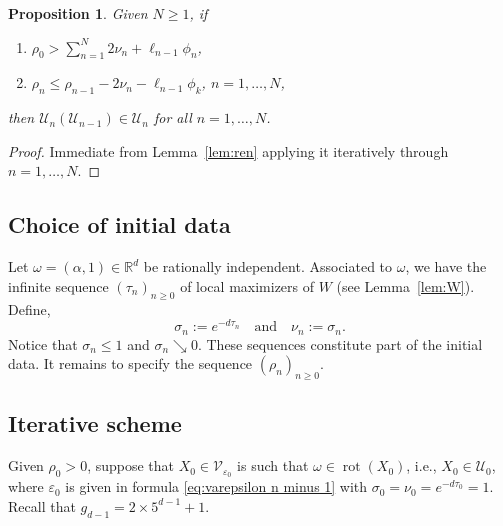 \documentclass[12pt,reqno,a4paper]{amsart}%
\numberwithin{equation}{section}
\newtheorem{proposition}[theorem]{Proposition}
\newcommand{\Vs}{{\mathscr{V}}}
\newcommand{\Us}{{\mathscr{U}}}
\newcommand{\UU}{{\mathcal U}}
\newcommand{\Rr}{{\mathbb{R}}}
\newcommand{\rot}{\operatorname{rot}}
\def\vecalf{{\text{$\alpha$}}}
\def\vecomega{{\text{$\omega$}}}
\begin{document}
\begin{proposition}\label{prop:ren}
Given $N\geq1$,  if
\begin{enumerate}
\item $\rho_{0}> \sum_{n=1}^{N}2\nu_{n}+\ell_{n-1}\phi_n$,  
\item $\rho_n \leq \rho_{n-1}-2\nu_n-\ell_{n-1}\phi_k$,  $n=1,\ldots,N$,
\end{enumerate}
then $\UU_n(\Us_{n-1})\in \Us_n$ for all $n=1,\ldots,N$.
\end{proposition}
\begin{proof}
Immediate from Lemma~\ref{lem:ren} applying it iteratively through $n=1,\ldots,N$.
\end{proof}

\subsection{Choice of initial data}
Let $\vecomega=(\vecalf,1)\in\Rr^d$ be rationally independent.   Associated to $\omega$, we have the infinite sequence $(\tau_n)_{n\geq0}$ of 
local maximizers of $W$ (see Lemma~\ref{lem:W}).  Define,
$$
\sigma_n:= e^{-d\tau_n}\quad \text{and}\quad \nu_n:=\sigma_n.
$$  
Notice that $\sigma_n\leq 1$ and $\sigma_n \searrow 0$.
These sequences constitute part of the initial data. It remains to specify the sequence $(\rho_n)_{n\geq0}$.  

\subsection{Iterative scheme}
Given $\rho_0>0$, suppose that $X_0\in\Vs_{\varepsilon_0}$ is such that $\omega\in \rot(X_0)$, i.e., $X_0\in\Us_0$,  where $\varepsilon_0$ is given in formula \eqref{eq:varepsilon n minus 1} with $\sigma_0=\nu_0=e^{-d\tau_0}=1$.  Recall that $g_{d-1}=2\times 5^{d-1}+1$.
\end{document}
